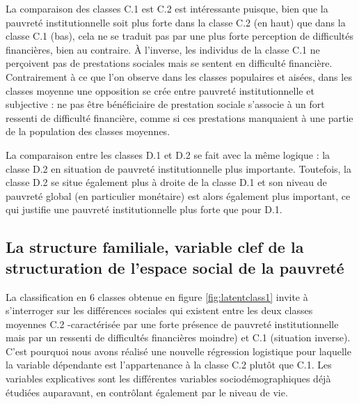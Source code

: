 \documentclass[12pt,a4paper]{reedthesis}
\begin{document}
La comparaison des classes C.1 est C.2 est intéressante puisque, bien que la pauvreté institutionnelle soit plus forte dans la classe C.2 (en haut) que dans la classe C.1 (bas), cela ne se traduit pas par une plus forte perception de difficultés financières, bien au contraire. À l'inverse, les individus de la classe C.1 ne perçoivent pas de prestations sociales mais se sentent en difficulté financière. Contrairement à ce que l'on observe dans les classes populaires et aisées, dans les classes moyenne une opposition se crée entre pauvreté institutionnelle et subjective : ne pas être bénéficiaire de prestation sociale s'associe à un fort ressenti de difficulté financière, comme si ces prestations manquaient à une partie de la population des classes moyennes.

La comparaison entre les classes D.1 et D.2 se fait avec la même logique : la classe D.2 en situation de pauvreté institutionnelle plus importante. Toutefois, la classe D.2 se situe également plus à droite de la classe D.1 et son niveau de pauvreté global (en particulier monétaire) est alors également plus important, ce qui justifie une pauvreté institutionnelle plus forte que pour D.1.

\hypertarget{sec:esexplostructufam}{%
\subsection{La structure familiale, variable clef de la structuration de l'espace social de la pauvreté}\label{sec:esexplostructufam}}

La classification en 6 classes obtenue en figure \ref{fig:latentclass1} invite à s'interroger sur les différences sociales qui existent entre les deux classes moyennes C.2 -caractérisée par une forte présence de pauvreté institutionnelle mais par un ressenti de difficultés financières moindre) et C.1 (situation inverse). C'est pourquoi nous avons réalisé une nouvelle régression logistique pour laquelle la variable dépendante est l'appartenance à la classe C.2 plutôt que C.1. Les variables explicatives sont les différentes variables sociodémographiques déjà étudiées auparavant, en contrôlant également par le niveau de vie.
\end{document}

